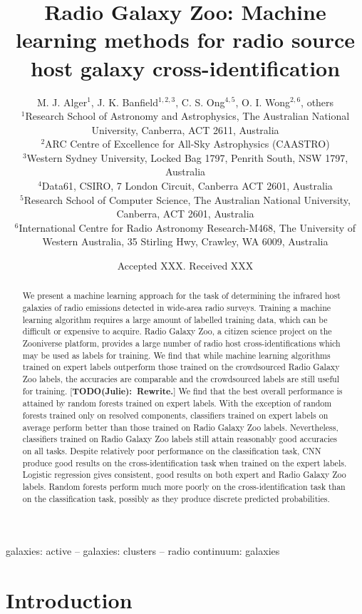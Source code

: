 \documentclass[fleqn,usenatbib,usedcolumn]{mnras}
\title[Machine learning methods for radio source cross-identification]{Radio Galaxy Zoo: Machine learning methods for radio source host galaxy cross-identification}
\author[Alger et al.]{M. J. Alger$^{1}$, J. K. Banfield$^{1, 2, 3}$, C. S. Ong$^{4, 5}$, O. I. Wong$^{2, 6}$, others
\\
$^{1}$Research School of Astronomy and Astrophysics, The Australian National University, Canberra, ACT 2611, Australia\\
$^{2}$ARC Centre of Excellence for All-Sky Astrophysics (CAASTRO)\\
$^{3}$Western Sydney University, Locked Bag 1797, Penrith South, NSW 1797, Australia\\
$^{4}$Data61, CSIRO, 7 London Circuit, Canberra ACT 2601, Australia\\
$^{5}$Research School of Computer Science, The Australian National University, Canberra, ACT 2601, Australia\\
$^{6}$International Centre for Radio Astronomy Research-M468, The University of Western Australia, 35 Stirling Hwy, Crawley, WA 6009, Australia
}
\date{Accepted XXX. Received XXX}
\newcommand{\matthew}[2]{ {\color{white!20!violet}[{\bf TODO(#1):~{#2}}]} }
\begin{document}
\label{firstpage}
\pagerange{\pageref{firstpage}--\pageref{lastpage}}
\maketitle

\begin{abstract}
  We present a machine learning approach for the task of determining the
  infrared host galaxies of radio emissions detected in wide-area radio surveys.
  Training a machine learning algorithm requires a large amount of labelled
  training data, which can be difficult or expensive to acquire. Radio Galaxy
  Zoo, a citizen science project on the Zooniverse platform, provides a large
  number of radio host cross-identifications which may be used as labels for
  training. We find that while machine learning algorithms trained on expert
  labels outperform those trained on the crowdsourced Radio Galaxy Zoo labels,
  the accuracies are comparable and the crowdsourced labels are still useful for
  training. \matthew{Julie}{Rewrite.}
  We find that the
  best overall performance is attained by random forests trained on expert
  labels. With the exception of random forests trained only on resolved
  components, classifiers trained on expert labels on average perform better
  than those trained on Radio Galaxy Zoo labels. Nevertheless, classifiers
  trained on Radio Galaxy Zoo labels still attain reasonably good accuracies on
  all tasks. Despite relatively poor performance on the
  classification task, CNN produce good results on the cross-identification task
  when trained on the expert labels. Logistic regression gives consistent, good
  results on both expert and Radio Galaxy Zoo labels. Random forests perform
  much more poorly on the cross-identification task than on the classification
  task, possibly as they produce discrete predicted probabilities.
\end{abstract}

\begin{keywords}
galaxies: active -- galaxies: clusters -- radio continuum: galaxies
\end{keywords}


\section{Introduction}\label{introduction}
\end{document}

